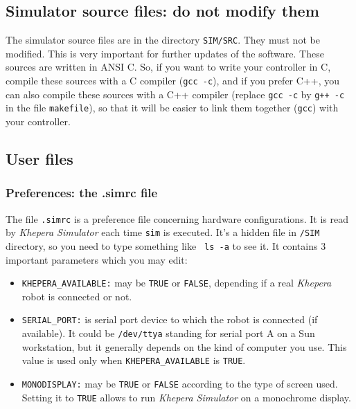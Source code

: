 \documentclass[a4paper,twoside]{article}
\begin{document}
\subsection{Simulator source files: do not modify them}

The simulator source files are in the directory {\tt SIM/SRC}. They must not
be modified. This is very important for further updates of the software. These
sources are written in ANSI C. So, if you want to write your controller in C,
compile these sources with a C compiler ({\tt gcc -c}), and if you prefer C++,
you can also compile these sources with a C++ compiler (replace {\tt gcc -c} by
{\tt g++ -c} in the file {\tt makefile}), so that it will be easier to link
them together ({\tt gcc}) with your controller.

\subsection{User files}

\subsubsection{Preferences: the .simrc file}

The file {\tt .simrc} is a preference file concerning hardware configurations.
It is read by {\em Khepera Simulator} each time {\tt sim} is executed. It's a
hidden file in {\tt /SIM} directory, so you need to type something like {\tt
ls -a} to see it. It contains 3 important parameters which you may edit:

\begin{itemize}

\item {\tt KHEPERA\_AVAILABLE:} may be {\tt TRUE} or {\tt FALSE}, depending if
a real {\em Khepera} robot is connected or not.

\item {\tt SERIAL\_PORT:} is serial port device to which the robot is connected
(if available). It could be {\tt /dev/ttya} standing for serial port A on a
Sun workstation, but it generally depends on the kind of computer you use. This
value is used only when {\tt KHEPERA\_AVAILABLE} is {\tt TRUE}.

\item {\tt MONODISPLAY:} may be {\tt TRUE} or {\tt FALSE} according to the
type of screen used. Setting it to {\tt TRUE} allows to run {\em Khepera
Simulator} on a monochrome display.

\end{itemize}
\end{document}
